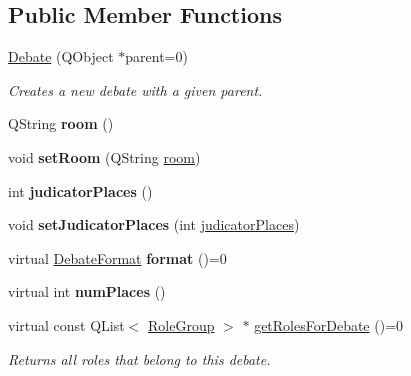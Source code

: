 \subsection*{Public Member Functions}
\begin{DoxyCompactItemize}
\item 
\hypertarget{classDebate_a89c49e04f0f5be4690ae6a0f231e2d57}{\hyperlink{classDebate_a89c49e04f0f5be4690ae6a0f231e2d57}{Debate} (Q\-Object $\ast$parent=0)}\label{classDebate_a89c49e04f0f5be4690ae6a0f231e2d57}

\begin{DoxyCompactList}\small\item\em Creates a new debate with a given parent. \end{DoxyCompactList}\item 
\hypertarget{classDebate_a6976d53aef96511860ee0610b35ef5d0}{Q\-String {\bfseries room} ()}\label{classDebate_a6976d53aef96511860ee0610b35ef5d0}

\item 
\hypertarget{classDebate_ad4d918691e512ca0e9f8bdfde1b60a7d}{void {\bfseries set\-Room} (Q\-String \hyperlink{classDebate_acab8c12e87212bbc6f14ce180bbdeccb}{room})}\label{classDebate_ad4d918691e512ca0e9f8bdfde1b60a7d}

\item 
\hypertarget{classDebate_a08898c144700ac4bfdf8176e79714c7c}{int {\bfseries judicator\-Places} ()}\label{classDebate_a08898c144700ac4bfdf8176e79714c7c}

\item 
\hypertarget{classDebate_a3a21fd3392281d2f1be94b8978c30e98}{void {\bfseries set\-Judicator\-Places} (int \hyperlink{classDebate_a871a42bb78323df624bd51ee733d3f5d}{judicator\-Places})}\label{classDebate_a3a21fd3392281d2f1be94b8978c30e98}

\item 
\hypertarget{classDebate_af280a91845695a6ad94e0a6bf6972a84}{virtual \hyperlink{classDebate_a537fac343de1edd412012e4180b52e04}{Debate\-Format} {\bfseries format} ()=0}\label{classDebate_af280a91845695a6ad94e0a6bf6972a84}

\item 
\hypertarget{classDebate_a52d7e3651ac81f31e3439a824b862f29}{virtual int {\bfseries num\-Places} ()}\label{classDebate_a52d7e3651ac81f31e3439a824b862f29}

\item 
\hypertarget{classDebate_ad4c84895868fd2e55e8d98c81afae7c6}{virtual const Q\-List$<$ \hyperlink{classDebate_ae9871a36a2f3de7a7da8922d70fbece4}{Role\-Group} $>$ $\ast$ \hyperlink{classDebate_ad4c84895868fd2e55e8d98c81afae7c6}{get\-Roles\-For\-Debate} ()=0}\label{classDebate_ad4c84895868fd2e55e8d98c81afae7c6}

\begin{DoxyCompactList}\small\item\em Returns all roles that belong to this debate. \end{DoxyCompactList}\end{DoxyCompactItemize}
